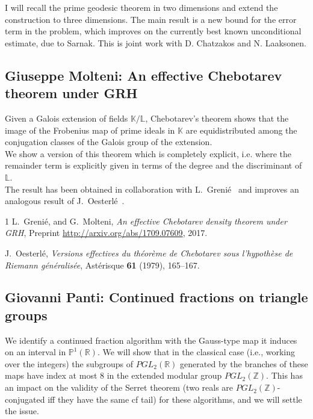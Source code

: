 \documentclass[15pt]{article}
\begin{document}
I will recall the prime geodesic theorem in two dimensions and extend the construction to three dimensions. The main result is a new bound for the error term in the problem, which improves on the currently best known unconditional estimate, due to Sarnak. This is joint work with D. Chatzakos and N. Laaksonen.


\subsection*{Giuseppe Molteni: An effective Chebotarev theorem under GRH}

Given a Galois extension of fields $\mathbb{K}/\mathbb{L}$, Chebotarev's theorem
shows that the image of the Frobenius map of prime ideals in $\mathbb{K}$ are equidistributed
among the conjugation classes of the Galois group of the extension.\\
We show a version of this theorem which is completely explicit, i.e. where the remainder term
is explicitly given in terms of the degree and the discriminant of $\mathbb{L}$.\\
The result has been obtained in collaboration with L.~Greni\'{e}~\cite{GrenieMolteni} and improves
an analogous result of J.~Oesterl\'{e}~\cite{Oesterle}.

{\small
\begin{thebibliography}{1}
L.~Greni\'{e}, and G.~Molteni, \emph{An effective Chebotarev density theorem under GRH}, Preprint
\url{http://arxiv.org/abs/1709.07609}, 2017.

J.~Oesterl\'{e}, \emph{Versions effectives du th\'{e}or\`{e}me de {C}hebotarev
  sous l'hypoth\`{e}se de {R}iemann g\'{e}n\'{e}ralis\'{e}e}, Ast\'{e}risque
  \textbf{61} (1979), 165--167.
\end{thebibliography}
}

\subsection*{Giovanni Panti: Continued fractions on triangle groups}

We identify a continued fraction algorithm with the Gauss-type map it induces on an interval in $\mathbb P^1(\mathbb R)$. We will show that in the classical case (i.e., working over the integers) the subgroups of $PGL_2(\mathbb R)$ generated by the branches of these maps have index at most 8 in the extended modular group $PGL_2(\mathbb Z)$. This has an impact on the validity of the Serret theorem (two reals are $PGL_2(\mathbb Z)$-conjugated iff they have the same cf tail) for these algorithms, and we will settle the issue.
\end{document}

